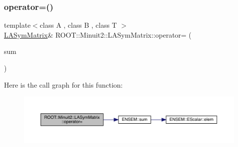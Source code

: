 \subsubsection{\texorpdfstring{operator=()}{operator=()}\hspace{0.1cm}{\footnotesize\ttfamily [8/14]}}
{\footnotesize\ttfamily template$<$class A , class B , class T $>$ \\
\mbox{\hyperlink{classROOT_1_1Minuit2_1_1LASymMatrix}{L\+A\+Sym\+Matrix}}\& R\+O\+O\+T\+::\+Minuit2\+::\+L\+A\+Sym\+Matrix\+::operator= (\begin{DoxyParamCaption}\item[{const \mbox{\hyperlink{classROOT_1_1Minuit2_1_1ABObj}{A\+B\+Obj}}$<$ \mbox{\hyperlink{classROOT_1_1Minuit2_1_1sym}{sym}}, \mbox{\hyperlink{classROOT_1_1Minuit2_1_1ABSum}{A\+B\+Sum}}$<$ \mbox{\hyperlink{classROOT_1_1Minuit2_1_1ABObj}{A\+B\+Obj}}$<$ \mbox{\hyperlink{classROOT_1_1Minuit2_1_1sym}{sym}}, A, T $>$, \mbox{\hyperlink{classROOT_1_1Minuit2_1_1ABObj}{A\+B\+Obj}}$<$ \mbox{\hyperlink{classROOT_1_1Minuit2_1_1sym}{sym}}, B, T $>$ $>$, T $>$ \&}]{sum }\end{DoxyParamCaption})\hspace{0.3cm}{\ttfamily [inline]}}

Here is the call graph for this function\+:
\nopagebreak
\begin{figure}[H]
\begin{center}
\leavevmode
\includegraphics[width=350pt]{d3/d72/classROOT_1_1Minuit2_1_1LASymMatrix_a88d40828624a6418f8b94e239e30d322_cgraph}
\end{center}
\end{figure}
\mbox{\label{classROOT_1_1Minuit2_1_1LASymMatrix_abaf8a2feeb04c66aca17e5876dd7aaff}} 
